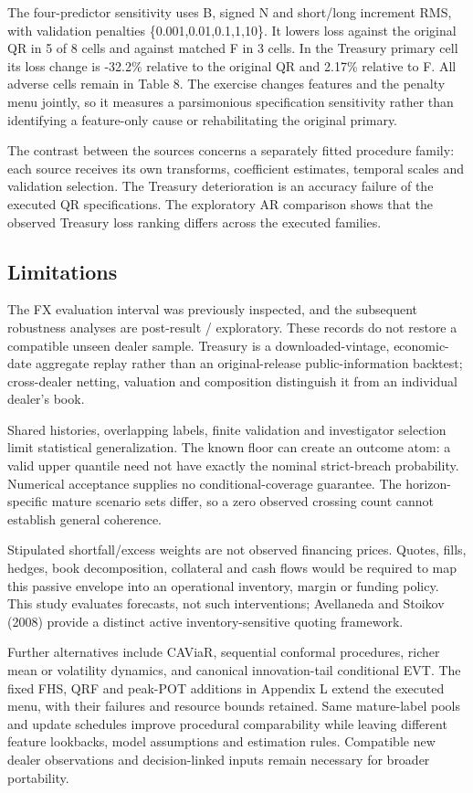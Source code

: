 \documentclass[10pt,a4paper]{article}
\begin{document}
The four-predictor sensitivity uses B, signed N and short/long increment RMS, with validation penalties \{0.001,0.01,0.1,1,10\}. It lowers loss against the original QR in 5 of 8 cells and against matched F in 3 cells. In the Treasury primary cell its loss change is -32.2\% relative to the original QR and 2.17\% relative to F. All adverse cells remain in Table 8. The exercise changes features and the penalty menu jointly, so it measures a parsimonious specification sensitivity rather than identifying a feature-only cause or rehabilitating the original primary.

The contrast between the sources concerns a separately fitted procedure family: each source receives its own transforms, coefficient estimates, temporal scales and validation selection. The Treasury deterioration is an accuracy failure of the executed QR specifications. The exploratory AR comparison shows that the observed Treasury loss ranking differs across the executed families.

\subsection*{Limitations}
The FX evaluation interval was previously inspected, and the subsequent robustness analyses are post-result / exploratory. These records do not restore a compatible unseen dealer sample. Treasury is a downloaded-vintage, economic-date aggregate replay rather than an original-release public-information backtest; cross-dealer netting, valuation and composition distinguish it from an individual dealer's book.

Shared histories, overlapping labels, finite validation and investigator selection limit statistical generalization. The known floor can create an outcome atom: a valid upper quantile need not have exactly the nominal strict-breach probability. Numerical acceptance supplies no conditional-coverage guarantee. The horizon-specific mature scenario sets differ, so a zero observed crossing count cannot establish general coherence.

Stipulated shortfall/excess weights are not observed financing prices. Quotes, fills, hedges, book decomposition, collateral and cash flows would be required to map this passive envelope into an operational inventory, margin or funding policy. This study evaluates forecasts, not such interventions; Avellaneda and Stoikov (2008) provide a distinct active inventory-sensitive quoting framework.

Further alternatives include CAViaR, sequential conformal procedures, richer mean or volatility dynamics, and canonical innovation-tail conditional EVT. The fixed FHS, QRF and peak-POT additions in Appendix L extend the executed menu, with their failures and resource bounds retained. Same mature-label pools and update schedules improve procedural comparability while leaving different feature lookbacks, model assumptions and estimation rules. Compatible new dealer observations and decision-linked inputs remain necessary for broader portability.
\end{document}
